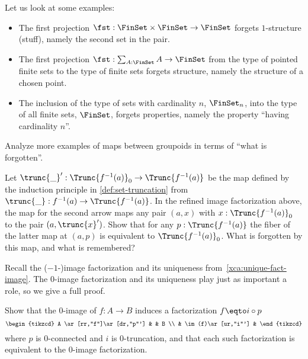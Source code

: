 \begin{example}\label{exa:stuff-struct-prop}
  Let us look at some examples:
  \begin{itemize}
  \item The first projection $\fst : \FinSet \times \FinSet \to \FinSet$
    forgets $1$-structure (stuff), namely the second set in the pair.
  \item The first projection $\fst : \sum_{A:\FinSet} A \to \FinSet$
    from the type of pointed finite sets to the type of finite sets
    forgets structure, namely the structure of a chosen point.
  \item The inclusion of the type of sets with cardinality
    $n$, $\FinSet_n$, into the type of all finite sets, $\FinSet$,
    forgets properties, namely the property
    ``having cardinality $n$''.\qedhere
    \end{itemize}
\end{example}
\begin{xca}\label{xca:stuff-struct-prop}
  Analyze more examples of maps between groupoids
  in terms of ``what is forgotten''.
\end{xca}
\begin{xca}\label{xca:0Im-to-Im}
  Let $\trunc{\_}' : \Trunc{f^{-1}(a)}_0 \to \Trunc{f^{-1}(a)}$ be the
  map defined by the induction principle in \cref{def:set-truncation}
  from $\trunc{\_} : f^{-1}(a) \to \Trunc{f^{-1}(a)}$.
  In the refined image factorization above, the map for the second arrow
  maps any pair $(a,x)$ with $x:\Trunc{f^{-1}(a)}_0$ to the pair $(a,\trunc{x}')$.
  Show that for any $p:\Trunc{f^{-1}(a)}$ the fiber of the latter map at $(a,p)$
  is equivalent to $\Trunc{f^{-1}(a)}_0$. What is forgotten by this map,
  and what is remembered?
\end{xca}

Recall the ($-1$-)image factorization and its uniqueness from~\cref{xca:unique-fact-image}.
The $0$-image factorization and its uniqueness play just as important a role,
so we give a full proof.
\begin{theorem}\label{thm:unique-fact-0image}
  Show that the $0$-image of $f : A \to B$ induces a factorization $f \eqto i\circ p$
  \[
    \begin{tikzcd}
      A \ar[rr,"f"]\ar[dr,"p"'] & & B \\
      & \im(f)\ar[ur,"i"'] &
    \end{tikzcd}
  \]
  where $p$ is $0$-connected and $i$ is $0$-truncation,
  and that each such factorization
  is equivalent to the $0$-image factorization.
\end{theorem}

